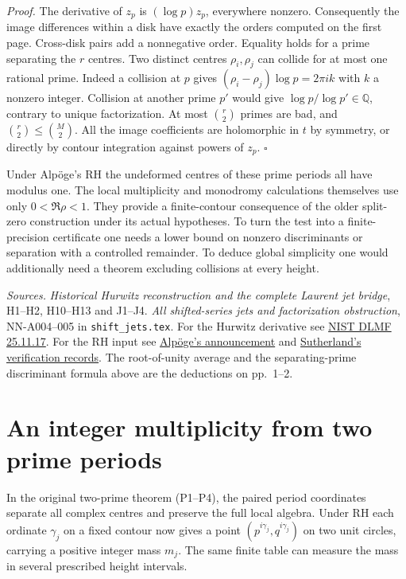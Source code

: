 \documentclass[11pt,a4paper]{article}
\begin{document}
\textit{Proof.} The derivative of $z_p$ is $(\log p)z_p$, everywhere nonzero. Consequently the image differences
within a disk have exactly the orders computed on the first page. Cross-disk pairs add a nonnegative order.
Equality holds for a prime separating the $r$ centres. Two distinct centres $\rho_i,\rho_j$ can collide for
at most one rational prime. Indeed a collision at $p$ gives $(\rho_i-\rho_j)\log p=2\pi i k$ with $k$ a
nonzero integer. Collision at another prime $p'$ would give $\log p/\log p'\in\mathbb Q$, contrary to unique
factorization. At most $\binom r2$ primes are bad, and $\binom r2\le\binom M2$. All the image coefficients are
holomorphic in $t$ by symmetry, or directly by contour integration against powers of $z_p$. \hfill$\square$

Under Alpöge's RH the undeformed centres of these prime periods all have modulus one. The local multiplicity
and monodromy calculations themselves use only $0<\Re\rho<1$. They provide a finite-contour consequence of the
older split-zero construction under its actual hypotheses. To turn the test into a finite-precision certificate
one needs a lower bound on nonzero discriminants or separation with a controlled remainder. To deduce global
simplicity one would additionally need a theorem excluding collisions at every height.

\medskip
\textit{Sources.} \emph{Historical Hurwitz reconstruction and the complete Laurent jet bridge}, H1--H2, H10--H13
and J1--J4. \emph{All shifted-series jets and factorization obstruction}, NN-A004--005 in
\texttt{shift\_jets.tex}. For the Hurwitz derivative see
\href{https://dlmf.nist.gov/25.11.E17}{NIST DLMF 25.11.17}. For the RH input see
\href{https://alpo.ge/remark.pdf}{Alpöge's announcement} and
\href{https://math.mit.edu/~drew/grh/}{Sutherland's verification records}. The root-of-unity average and
the separating-prime discriminant formula above are the deductions on pp.~1--2.

\newpage
\section*{An integer multiplicity from two prime periods}
In the original two-prime theorem (P1--P4), the paired period coordinates separate all complex
centres and preserve the full local algebra. Under RH each ordinate $\gamma_j$ on a fixed contour
now gives a point $(p^{i\gamma_j},q^{i\gamma_j})$ on two unit circles, carrying a positive integer
mass $m_j$. The same finite table can measure the mass in several prescribed height intervals.
\end{document}

